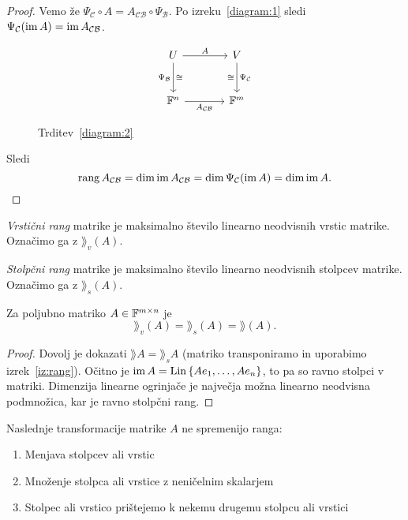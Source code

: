 \documentclass[12pt, a4paper]{article}
\begin{document}
\begin{proof}
Vemo že $\Psi_{\mathcal{C}}\circ A=A_{\mathcal{CB}}\circ\Psi_{\mathcal{B}}$. Po izreku~\ref{diagram:1} sledi $\Psi_{\mathcal{C}}(\operatorname{im} A)=\operatorname{im} A_{\mathcal{CB}}$.

\begin{figure}[H]
\[
\begin{tikzcd}[column sep=large, row sep=large]
U
\arrow[r, "A"]
\arrow[d, "\Psi_{\mathcal{B}}"', "\cong"] & V \arrow[d, "\Psi_{\mathcal{C}}", "\cong"'] \\
\F^n \arrow[r, "A_{\mathcal{CB}}"'] & \F^m
\end{tikzcd}
\]
\caption{Trditev~\ref{diagram:2}}
\end{figure}

Sledi
\[
\operatorname{rang} A_{\mathcal{CB}}=\dim\operatorname{im} A_{\mathcal{CB}}=\dim \Psi_{\mathcal{C}}(\operatorname{im} A)=\dim\operatorname{im} A.\qedhere
\]
\end{proof}

\begin{definicija}
\emph{Vrstični rang} matrike je maksimalno število linearno neodvisnih vrstic matrike. Označimo ga z $\rang_v(A)$.

\emph{Stolpčni rang} matrike je maksimalno število linearno neodvisnih stolpcev matrike. Označimo ga z $\rang_s(A)$.
\end{definicija}

\begin{izrek}
Za poljubno matriko $A\in\mathbb{F}^{m\times n}$ je
\[
\rang_v(A)=\rang_s(A)=\rang(A).
\]
\end{izrek}

\begin{proof}
Dovolj je dokazati $\rang A=\rang_s A$ (matriko transponiramo in uporabimo izrek~\ref{iz:rang}). Očitno je $\operatorname{im} A=\operatorname{Lin}\left\{Ae_1,\dots,Ae_n\right\}$, to pa so ravno stolpci v matriki. Dimenzija linearne ogrinjače je največja možna linearno neodvisna podmnožica, kar je ravno stolpčni rang.
\end{proof}

Naslednje transformacije matrike $A$ ne spremenijo ranga:

\begin{enumerate}[label=\roman*)]
\item Menjava stolpcev ali vrstic
\item Množenje stolpca ali vrstice z neničelnim skalarjem
\item Stolpec ali vrstico prištejemo k nekemu drugemu stolpcu ali vrstici
\end{enumerate}
\end{document}

